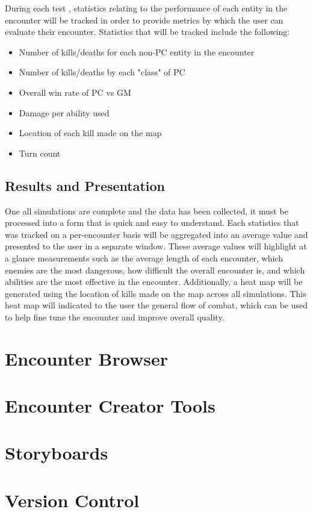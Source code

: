 \documentclass[12pt,a4paper]{report}
\begin{document}
		 During each test , statistics relating to the performance of each entity in the encounter will be tracked in order to provide metrics by which the user can evaluate their encounter. Statistics that will be tracked include the following:
		 
		\begin{itemize}
			\item Number of kills/deaths for each non-PC entity in the encounter
			\item Number of kills/deaths by each "class" of PC
			\item Overall win rate of PC vs GM
			\item Damage per ability used
			\item Location of each kill made on the map
			\item Turn count
		\end{itemize}
		
		\subsection{Results and Presentation}
		One all simulations are complete and the data has been collected, it must be processed into a form that is quick and easy to understand. Each statistics that was tracked on a per-encounter basis will be aggregated into an average value and presented to the user in a separate window. These average values will highlight at a glance measurements such as the average length of each encounter, which enemies are the most dangerous, how difficult the overall encounter is, and which abilities are the most effective in the encounter. Additionally, a heat map will be generated using the location of kills made on the map across all simulations. This heat map will indicated to the user the general flow of combat, which can be used to help fine tune the encounter and improve overall quality. 
		
	\section{Encounter Browser}
	\section{Encounter Creator Tools}
	\section{Storyboards}
	\section{Version Control}
\end{document}
